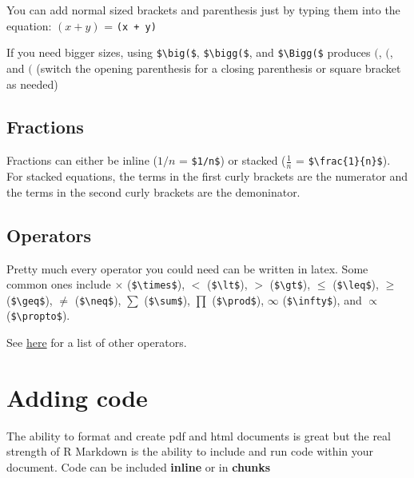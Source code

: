\documentclass[]{article}
\begin{document}
You can add normal sized brackets and parenthesis just by typing them
into the equation: \((x + y)\) = \texttt{(x\ +\ y)}

If you need bigger sizes, using \texttt{\$\textbackslash{}big(\$},
\texttt{\$\textbackslash{}bigg(\$}, and
\texttt{\$\textbackslash{}Bigg(\$} produces \(\big(\), \(\bigg(\), and
\(\Bigg(\) (switch the opening parenthesis for a closing parenthesis or
square bracket as needed)

\hypertarget{fractions}{%
\subsection{Fractions}\label{fractions}}

Fractions can either be inline (\(1/n\) = \texttt{\$1/n\$}) or stacked
(\(\frac{1}{n}\) = \texttt{\$\textbackslash{}frac\{1\}\{n\}\$}). For
stacked equations, the terms in the first curly brackets are the
numerator and the terms in the second curly brackets are the
demoninator.

\hypertarget{operators}{%
\subsection{Operators}\label{operators}}

Pretty much every operator you could need can be written in latex. Some
common ones include \(\times\) (\texttt{\$\textbackslash{}times\$}),
\(\lt\) (\texttt{\$\textbackslash{}lt\$}), \(\gt\)
(\texttt{\$\textbackslash{}gt\$}), \(\leq\)
(\texttt{\$\textbackslash{}leq\$}), \(\geq\)
(\texttt{\$\textbackslash{}geq\$}), \(\neq\)
(\texttt{\$\textbackslash{}neq\$}), \(\sum\)
(\texttt{\$\textbackslash{}sum\$}), \(\prod\)
(\texttt{\$\textbackslash{}prod\$}), \(\infty\)
(\texttt{\$\textbackslash{}infty\$}), and \(\propto\)
(\texttt{\$\textbackslash{}propto\$}).

See \href{http://web.ift.uib.no/Teori/KURS/WRK/TeX/symALL.html}{here}
for a list of other operators.

\hypertarget{adding-code}{%
\section{Adding code}\label{adding-code}}

The ability to format and create pdf and html documents is great but the
real strength of R Markdown is the ability to include and run code
within your document. Code can be included \textbf{inline} or in
\textbf{chunks}
\end{document}

